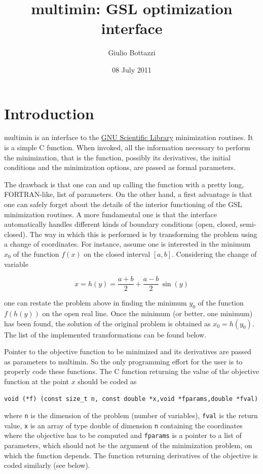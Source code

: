 \documentclass[11pt]{article}
\title{multimin: GSL optimization interface}
\author{Giulio Bottazzi}
\date{08 July 2011}
\begin{document}
\maketitle

\setcounter{tocdepth}{3}
\tableofcontents
\vspace*{1cm}


\section{Introduction}
\label{sec-1}


multimin is an interface to the \href{http://www.gnu.org/software/gsl/}{GNU Scientific Library} minimization
routines. It is a simple C function. When invoked, all the information
necessary to perform the minimization, that is the function, possibly
its derivatives, the initial conditions and the minimization options,
are passed as formal parameters.

The drawback is that one can and up calling the function with a pretty
long, FORTRAN-like, list of parameters. On the other hand, a first
advantage is that one can safely forget about the details of the
interior functioning of the GSL minimization routines. A more
fundamental one is that the interface automatically handles different
kinds of boundary conditions (open, closed, semi-closed). The way in
which this is performed is by transforming the problem using a change
of coordinates. For instance, assume one is interested in the minimum
$x_0$ of the function $f(x)$ on the closed interval
$[a,b]$. Considering the change of variable

\[
x=h(y)=\frac{a+b}{2} + \frac{a-b}{2} \, \sin(y)
\]

one can restate the problem above in finding the minimum $y_0$ of the
function $f(h(y))$ on the open real line. Once the minimum (or better,
one minimum) has been found, the solution of the original problem is
obtained as $x_0=h(y_0)$. The list of the implemented transformations
can be found below.

Pointer to the objective function to be minimized and its derivatives
are passed as parameters to multimin. So the only programming effort
for the user is to properly code these functions. The C function
returning the value of the objective function at the point $x$ should
be coded as
\begin{verbatim}
void (*f) (const size_t n, const double *x,void *fparams,double *fval)
\end{verbatim}
where \texttt{n} is the dimension of the problem (number of variables),
\texttt{fval} is the return value, \texttt{x} is an array of type double of
dimension \texttt{n} containing the coordinates where the objective has to be
computed and \texttt{fparams} is a pointer to a list of parameters, which
should not be the argument of the minimization problem, on which the
function depends. The function returning derivatives of the objective
is coded similarly (see below).
\end{document}
